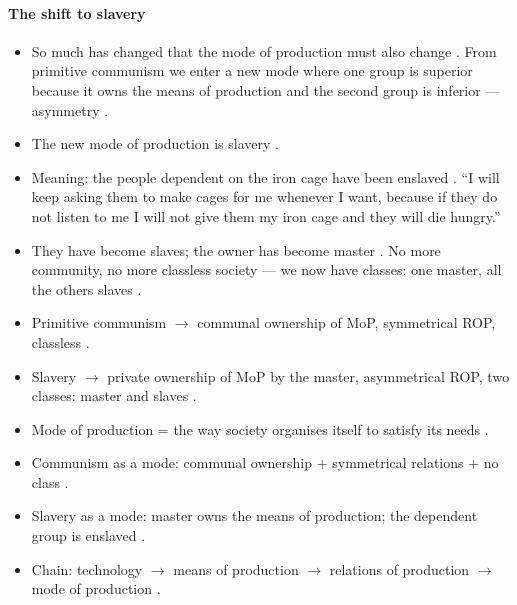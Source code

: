 \paragraph{The shift to slavery}
\begin{itemize}
    \item So much has changed that the mode of production must also change . From primitive communism we enter a new mode where one group is superior because it owns the means of production and the second group is inferior --- asymmetry .
    \item The new mode of production is slavery .
    \item Meaning: the people dependent on the iron cage have been enslaved . ``I will keep asking them to make cages for me whenever I want, because if they do not listen to me I will not give them my iron cage and they will die hungry.'' 
    \item They have become slaves; the owner has become master . No more community, no more classless society --- we now have classes: one master, all the others slaves .
\end{itemize}

\begin{ComparisonBox}
\begin{itemize}
    \item Primitive communism $\rightarrow$ communal ownership of MoP, symmetrical ROP, classless .
    \item Slavery $\rightarrow$ private ownership of MoP by the master, asymmetrical ROP, two classes: master and slaves .
\end{itemize}
\end{ComparisonBox}

\begin{QuickRevision}
\begin{itemize}
    \item Mode of production = the way society organises itself to satisfy its needs .
    \item Communism as a mode: communal ownership + symmetrical relations + no class .
    \item Slavery as a mode: master owns the means of production; the dependent group is enslaved .
    \item Chain: technology $\rightarrow$ means of production $\rightarrow$ relations of production $\rightarrow$ mode of production .
\end{itemize}
\end{QuickRevision}

